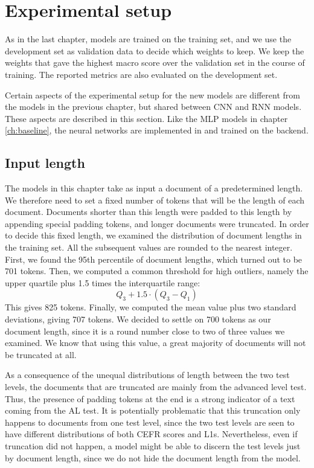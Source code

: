 \section{Experimental setup}

As in the last chapter, models are trained on the training set, and we use the
development set as validation data to decide which weights to keep. We keep
the weights that gave the highest macro \FI score over the validation set in
the course of training. The reported metrics are also evaluated on the
development set.

Certain aspects of the experimental setup for the new models are different
from the models in the previous chapter, but shared between \ac{CNN} and
\ac{RNN} models. These aspects are described in this section. Like the
\ac{MLP} models in chapter \ref{ch:baseline}, the neural networks are
implemented in \textcite{keras} and trained on the \textcite{tensorflow}
backend.


\subsection{Input length}

The models in this chapter take as input a document of a predetermined
length. We therefore need to set a fixed number of tokens that will be the
length of each document. Documents shorter than this length were padded to
this length by appending special padding tokens, and longer documents were
truncated. In order to decide this fixed length, we examined the distribution
of document lengths in the training set. All the subsequent values are
rounded to the nearest integer. First, we found the 95th percentile of
document lengths, which turned out to be 701 tokens. Then, we computed a
common threshold for high outliers, namely the upper quartile plus 1.5 times
the interquartile range:
\[
  Q_3 + 1.5 \cdot (Q_3 - Q_1)
\]
This gives 825 tokens. Finally, we computed the mean value plus two standard
deviations, giving 707 tokens. We decided to settle on 700 tokens as our
document length, since it is a round number close to two of three values we
examined. We know that using this value, a great majority of documents will
not be truncated at all.

As a consequence of the unequal distributions of length between the two test
levels, the documents that are truncated are mainly from the advanced level
test. Thus, the presence of padding tokens at the end is a strong indicator
of a text coming from the AL test. It is potentially problematic that this
truncation only happens to documents from one test level, since the two test
levels are seen to have different distributions of both CEFR scores and
\acp{L1}. Nevertheless, even if truncation did not happen, a model might be
able to discern the test levels just by document length, since we do not hide
the document length from the model.


